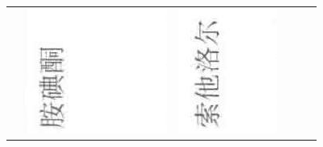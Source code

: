 \documentclass[10pt]{article}
\begin{document}
\begin{center}
\begin{tabular}{|c|c|c|c|c|c|}
 & \includegraphics[max width=\textwidth]{2024_07_05_645bb794a4d4f32ee0c8g-352(16)}
 & \includegraphics[max width=\textwidth]{2024_07_05_645bb794a4d4f32ee0c8g-352(8)}

\end{tabular}
\end{center}
\end{document}
